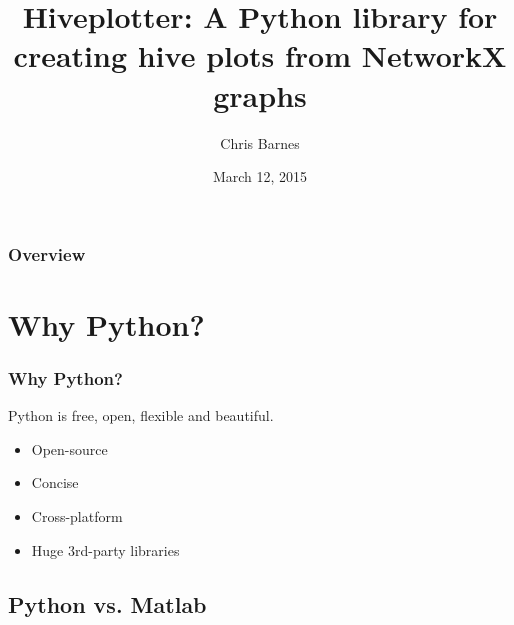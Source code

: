 \documentclass{beamer}
\title[hiveplotter]{Hiveplotter: A Python library for creating hive plots from NetworkX graphs} %
\author{Chris Barnes} %
\institute[MRC-LMB] %
{
MRC Laboratory of Molecular Biology \\ %
\medskip
\textit{cbarnes@mrc-lmb.cam.ac.uk} %
}
\date{March 12, 2015} %
\begin{document}
\begin{frame}
\titlepage %
\end{frame}

\begin{frame}
\frametitle{Overview} %
\tableofcontents %
\end{frame}


\section{Why Python?} %


\begin{frame}
\frametitle{Why Python?}
\begin{block}{}
Python is free, open, flexible and beautiful.
\end{block}

\begin{itemize}
\item Open-source
\item Concise
\item Cross-platform
\item Huge 3rd-party libraries
\end{itemize}
\end{frame}

\subsection{Python vs. Matlab} %
\end{document}
